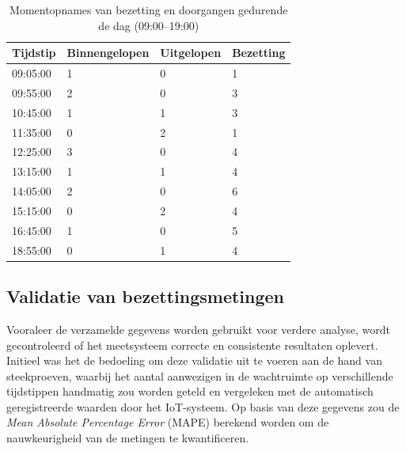 \begin{table}[h!]
    \caption{Momentopnames van bezetting en doorgangen gedurende de dag (09:00–19:00)}
    \begin{tabular}{p{4cm}p{5cm}p{3cm}p{2cm}}
        \toprule
        \textbf{Tijdstip} & \textbf{Binnengelopen} & \textbf{Uitgelopen} & \textbf{Bezetting} \\
        \midrule
        09:05:00 & 1 & 0 & 1 \\
        09:55:00 & 2 & 0 & 3 \\
        10:45:00 & 1 & 1 & 3 \\
        11:35:00 & 0 & 2 & 1 \\
        12:25:00 & 3 & 0 & 4 \\
        13:15:00 & 1 & 1 & 4 \\
        14:05:00 & 2 & 0 & 6 \\
        15:15:00 & 0 & 2 & 4 \\
        16:45:00 & 1 & 0 & 5 \\
        18:55:00 & 0 & 1 & 4 \\
        \bottomrule
    \end{tabular}
\end{table}



\subsection{Validatie van bezettingsmetingen}
Vooraleer de verzamelde gegevens worden gebruikt voor verdere analyse, wordt gecontroleerd of het meetsysteem correcte en consistente resultaten oplevert. Initieel was het de bedoeling om deze validatie uit te voeren aan de hand van steekproeven, waarbij het aantal aanwezigen in de wachtruimte op verschillende tijdstippen handmatig zou worden geteld en vergeleken met de automatisch geregistreerde waarden door het IoT-systeem. Op basis van deze gegevens zou de \textit{Mean Absolute Percentage Error} (MAPE) berekend worden om de nauwkeurigheid van de metingen te kwantificeren. \\

